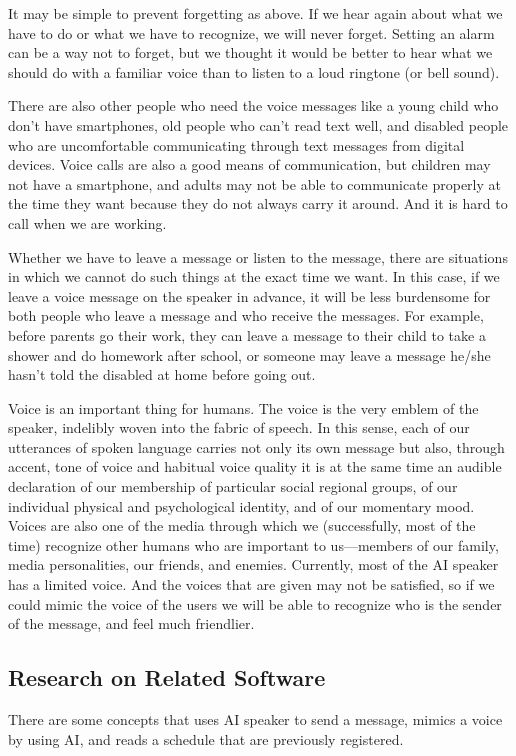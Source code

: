 \documentclass[conference]{IEEEtran}
\begin{document}
It may be simple to prevent forgetting as above. If we hear again about what we have to do or what we have to recognize, we will never forget. Setting an alarm can be a way not to forget, but we thought it would be better to hear what we should do with a familiar voice than to listen to a loud ringtone (or bell sound).

There are also other people who need the voice messages like a young child who don't have smartphones, old people who can't read text well, and disabled people who are uncomfortable communicating through text messages from digital devices. Voice calls are also a good means of communication, but children may not have a smartphone, and adults may not be able to communicate properly at the time they want because they do not always carry it around. And it is hard to call when we are working.

Whether we have to leave a message or listen to the message, there are situations in which we cannot do such things at the exact time we want.
In this case, if we leave a voice message on the speaker in advance, it will be less burdensome for both people who leave a message and who receive the messages. For example, before parents go their work, they can leave a message to their child to take a shower and do homework after school, or someone may leave a message he/she hasn't told the disabled at home before going out.

Voice is an important thing for humans. The voice is the very emblem of the speaker, indelibly woven into the fabric of speech. In this sense, each of our utterances of spoken language carries not only its own message but also, through accent, tone of voice and habitual voice quality it is at the same time an audible declaration of our membership of particular social regional groups, of our individual physical and psychological identity, and of our momentary mood. Voices are also one of the media through which we (successfully, most of the time) recognize other humans who are important to us—members of our family, media personalities, our friends, and enemies. Currently, most of the AI speaker has a limited voice. And the voices that are given may not be satisfied, so if we could mimic the voice of the users we will be able to recognize who is the sender of the message, and feel much friendlier.

\subsection{Research on Related Software}
There are some concepts that uses AI speaker to send a message, mimics a voice by using AI, and reads a schedule that are previously registered.\\
\end{document}
